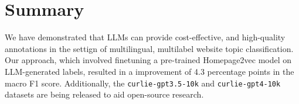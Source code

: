 \section{Summary}\label{sec:summary}

We have demonstrated that LLMs can provide cost-effective, and high-quality annotations in the settign of multilingual, multilabel website topic classification. Our approach, which involved finetuning a pre-trained Homepage2vec model on LLM-generated labels, resulted in a improvement of 4.3 percentage points in the macro F1 score.
Additionally, the \texttt{curlie-gpt3.5-10k} and \texttt{curlie-gpt4-10k} datasets \cite{curlie-gpt-10k} are being released to aid open-source research.